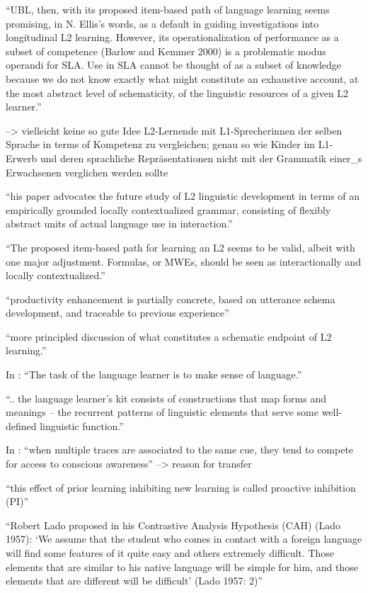 ``UBL, then, with its proposed item-based path of language learning seems
promising, in N. Ellis’s words, as a default in guiding investigations into
longitudinal L2 learning. However, its operationalization of performance as a
subset of competence (Barlow and Kemmer 2000) is a problematic modus
operandi for SLA. Use in SLA cannot be thought of as a subset of knowledge
because we do not know exactly what might constitute an exhaustive
account, at the most abstract level of schematicity, of the linguistic resources
of a given L2 learner.''

--> vielleicht keine so gute Idee L2-Lernende mit L1-Sprecherinnen der selben Sprache in terms of Kompetenz zu vergleichen; genau so wie Kinder im L1-Erwerb und deren sprachliche Repräsentationen nicht mit der Grammatik einer\_s Erwachsenen verglichen werden sollte

``his paper advocates the future study of L2 linguistic
development in terms of an empirically grounded locally contextualized
grammar, consisting of flexibly abstract units of actual language use in
interaction.''

``The proposed item-based path for learning an L2 seems to be valid, albeit
with one major adjustment. Formulas, or MWEs, should be seen as
interactionally and locally contextualized.''

``productivity enhancement is partially concrete, based on utterance schema
development, and traceable to previous experience''

``more principled discussion of what constitutes a schematic endpoint of L2 learning.''

In \cite{Ellis04}: ``The task of the language learner is to make sense of language.''

``.. the language learner's kit consists of constructions that map forms and meanings -- the recurrent patterns of linguistic elements that serve some well-defined linguistic function.''

In \cite{Ellis06}: ``when multiple
traces are associated to the same cue, they tend to compete for access to
conscious awareness'' --> reason for transfer

``this effect of prior learning inhibiting
new learning is called proactive inhibition (PI)''

``Robert Lado proposed in his
Contrastive Analysis Hypothesis (CAH) (Lado 1957): ‘We assume that the
student who comes in contact with a foreign language will find some features
of it quite easy and others extremely difficult. Those elements that are similar
to his native language will be simple for him, and those elements that
are different will be difficult’ (Lado 1957: 2)''

